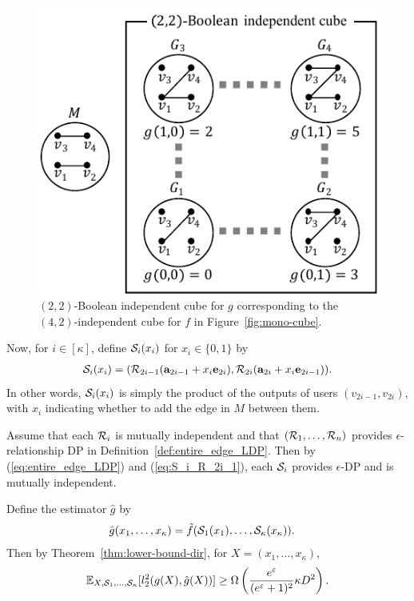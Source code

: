 {\begin{figure}[t]
  \centering
  \includegraphics[width=0.88\linewidth]{fig/BoolCube.pdf}
  \vspace{-4mm}
  \caption{
    $(2,2)$-Boolean independent cube for $g$ corresponding to the $(4,2)$-independent cube for $f$ in Figure~\ref{fig:mono-cube}.
  }\label{fig:Bool-cube}
\end{figure}

Now, for $i \in [\kappa]$, define $\mathcal{S}_i(x_i)$ for $x_i \in \{0,1\}$ by
\begin{align}
  \mathcal{S}_i(x_i) = (\mathcal{R}_{2i-1}(\mathbf{a}_{2i-1} + x_i \mathbf{e}_{2i}),
  \mathcal{R}_{2i}(\mathbf{a}_{2i} + x_i \mathbf{e}_{2i-1})).
  \label{eq:S_i_R_2i_1}
\end{align}
In other words, $\mathcal{S}_i(x_i)$ is simply the product of the outputs of users
$(v_{2i-1}, v_{2i})$, with $x_i$ indicating whether to add the edge in $M$ between them.

Assume that each $\mathcal{R}_i$ is mutually independent and that $(\mathcal{R}_1, \ldots, \mathcal{R}_n)$ provides $\epsilon$-relationship DP in Definition~\ref{def:entire_edge_LDP}. 
Then by (\ref{eq:entire_edge_LDP}) and (\ref{eq:S_i_R_2i_1}), each $\mathcal{S}_i$ provides $\epsilon$-DP and is mutually independent.

Define the estimator $\hat{g}$ by
\begin{align*}
  \hat{g}(x_1, \ldots, x_\kappa) &= \tilde{f}(\mathcal{S}_1(x_1), \ldots,
  \mathcal{S}_\kappa(x_\kappa)).
\end{align*}
Then by 
Theorem~\ref{thm:lower-bound-dir}, 
for 
$X=(x_1, \ldots, x_\kappa)$, 
\[
  \mathbb{E}_{X,\mathcal{S}_1, \ldots, \mathcal{S}_\kappa}[l_2^2(g(X), \hat{g}(X) )] \geq \Omega \left(
  \frac{e^{\varepsilon}}{(e^{\varepsilon}+1)^2} \kappa D^2 \right).
\]

}
